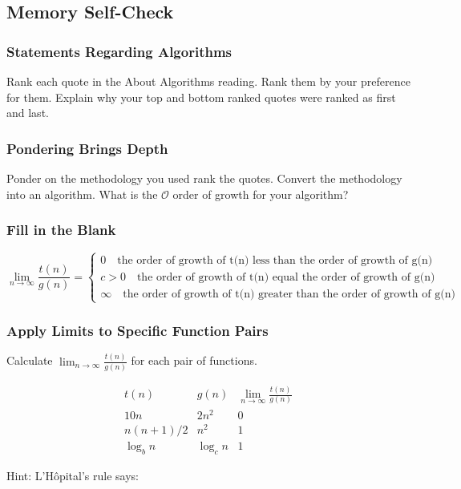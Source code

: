 \documentclass[12pt]{amsart}
\begin{document}
\subsection{Memory Self-Check}

\subsubsection{Statements Regarding Algorithms}
Rank each quote in the About Algorithms reading. Rank them by your preference for them. Explain why your top and bottom ranked quotes were ranked as first and last.
\subsubsection{Pondering Brings Depth}
Ponder on the methodology you used rank the quotes. Convert the methodology into an algorithm. What is the $\mathcal{O}$ order of growth for your algorithm?

\subsubsection{Fill in the Blank}

\[ \lim_{n \rightarrow \infty} \frac{t(n)}{g(n)} = \begin{cases}
    0\quad \text{the order of growth of t(n) less than the order of growth of g(n)}\\
    c>0\quad\text{the order of growth of t(n) equal the order of growth of g(n)}\\
    \infty \quad  \text{the order of growth of t(n) greater than the order of growth of g(n)}
\end{cases} 
\]

\subsubsection{Apply Limits to Specific Function Pairs}
Calculate $\lim_{n \rightarrow \infty} \frac{t(n)}{g(n)}$ for each pair of functions.  

\[\begin{array}{lcl}
     t(n) & g(n) & \lim_{n \rightarrow \infty} \frac{t(n)}{g(n)}\\ \hline
     10n   & 2n^2 & 0\\
     n(n+1)/2  & n^2 & 1 \\
     \log_{b}n  & \log_{c}n & 1
     \end{array}\]

Hint: L'H\^{o}pital's rule says:
\end{document}

